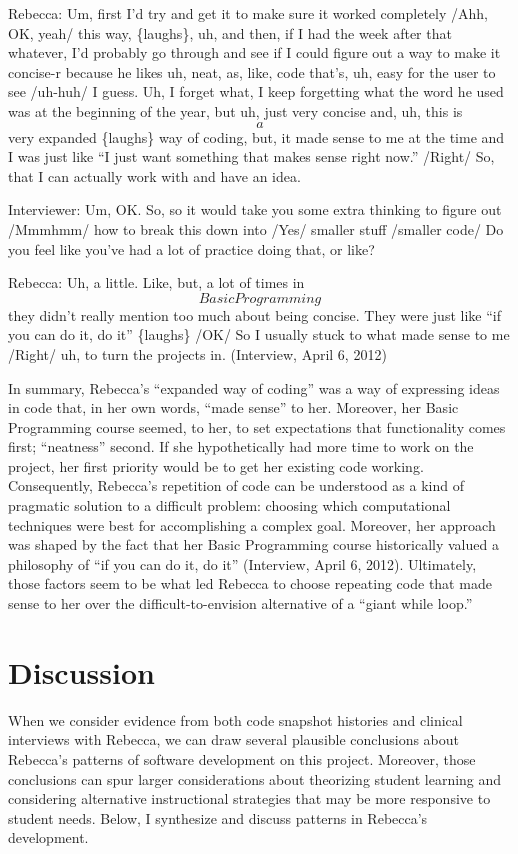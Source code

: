 Rebecca: Um, first I'd try and get it to make sure it worked completely /Ahh, OK, yeah/ this way, \{laughs\}, uh, and then, if I had the week after that whatever, I'd probably go through and see if I could figure out a way to make it concise-r because he likes uh, neat, as, like, code that's, uh, easy for the user to see /uh-huh/ I guess. Uh, I forget what, I keep forgetting what the word he used was at the beginning of the year, but uh, just very concise and, uh, this is \[a\] very expanded \{laughs\} way of coding, but, it made sense to me at the time and I was just like ``I just want something that makes sense right now.'' /Right/ So, that I can actually work with and have an idea.

Interviewer: Um, OK. So, so it would take you some extra thinking to figure out /Mmmhmm/ how to break this down into /Yes/ smaller stuff /smaller code/ Do you feel like you've had a lot of practice doing that, or like?

Rebecca: Uh, a little. Like, but, a lot of times in \[Basic Programming\] they didn't really mention too much about being concise. They were just like ``if you can do it, do it'' \{laughs\} /OK/ So I usually stuck to what made sense to me /Right/ uh, to turn the projects in. (Interview, April 6, 2012)

In summary, Rebecca's ``expanded way of coding'' was a way of expressing ideas in code that, in her own words, ``made sense'' to her. Moreover, her Basic Programming course seemed, to her, to set expectations that functionality comes first; ``neatness'' second. If she hypothetically had more time to work on the project, her first priority would be to get her existing code working. Consequently, Rebecca's repetition of code can be understood as a kind of pragmatic solution to a difficult problem: choosing which computational techniques were best for accomplishing a complex goal. Moreover, her approach was shaped by the fact that her Basic Programming course historically valued a philosophy of ``if you can do it, do it'' (Interview, April 6, 2012). Ultimately, those factors seem to be what led Rebecca to choose repeating code that made sense to her over the difficult-to-envision alternative of a ``giant while loop.''

\section{Discussion}\label{discussion}

When we consider evidence from both code snapshot histories and clinical interviews with Rebecca, we can draw several plausible conclusions about Rebecca's patterns of software development on this project. Moreover, those conclusions can spur larger considerations about theorizing student learning and considering alternative instructional strategies that may be more responsive to student needs. Below, I synthesize and discuss patterns in Rebecca's development.

